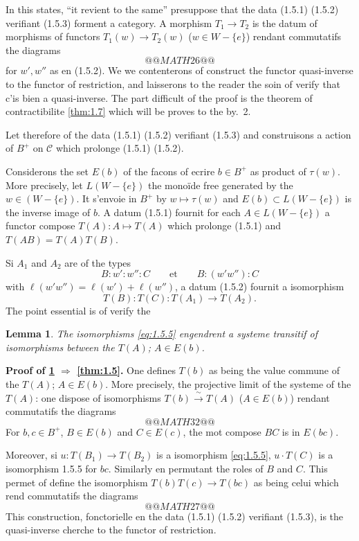 \documentclass[11pt,a4paper]{article}
\theoremstyle{plain}
\newtheorem{lemma}[theorem]{Lemma}
\theoremstyle{definition}
\newcommand{\cC}{\mathscr{C}}
\begin{document}
In this states, ``it revient to the same'' presuppose that the data (1.5.1) (1.5.2) verifiant (1.5.3) forment a category. A morphism $T_1 \to T_2$ is the datum of morphisms of functors $T_1(w) \to T_2(w)$ ($w \in W - \{e\}$) rendant commutatifs the diagrams
\[
@@MATH26@@
\]
for $w', w''$ as en (1.5.2). We we contenterons of construct the functor quasi-inverse to the functor of restriction, and laisserons to the reader the soin of verify that c'is bien a quasi-inverse. The part difficult of the proof is the theorem of contractibilite \ref{thm:1.7} which will be proves to the by.~2.

Let therefore of the data (1.5.1) (1.5.2) verifiant (1.5.3) and construisons a action of $B^+$ on $\cC$ which prolonge (1.5.1) (1.5.2).

Considerons the set $E(b)$ of the facons of ecrire $b \in B^+$ as product of $\tau(w)$. More precisely, let $L(W - \{e\})$ the mono\"ide free generated by the $w \in (W - \{e\})$. It s'envoie in $B^+$ by $w \mapsto \tau(w)$ and $E(b) \subset L(W - \{e\})$ is the inverse image of $b$. A datum (1.5.1) fournit for each $A \in L(W - \{e\})$ a functor compose $T(A) : A \mapsto T(A)$ which prolonge (1.5.1) and $T(AB) = T(A)T(B)$.

Si $A_1$ and $A_2$ are of the types
\begin{equation}\label{eq:1.5.4}
B : w' : w'' : C \qquad \text{et} \qquad B : (w'w'') : C
\end{equation}
with $\ell(w'w'') = \ell(w') + \ell(w'')$, a datum (1.5.2) fournit a isomorphism
\begin{equation}\label{eq:1.5.5}
T(B) : T(C) : T(A_1) \to T(A_2).
\tag{1.5.5}
\end{equation}
The point essential is of verify the

\begin{lemma}\label{lem:1.6}
The isomorphisms \eqref{eq:1.5.5} engendrent a systeme transitif of isomorphisms between the $T(A)$; $A \in E(b)$.
\end{lemma}

\noindent\textbf{Proof of \ref{lem:1.6} $\Rightarrow$ \ref{thm:1.5}.} One defines $T(b)$ as being the value commune of the $T(A)$; $A \in E(b)$. More precisely, the projective limit of the systeme of the $T(A)$: one dispose of isomorphisms $T(b) \xrightarrow{\;\sim\;} T(A)$ ($A \in E(b)$) rendant commutatifs the diagrams
\[
@@MATH32@@
\]
For $b, c \in B^+$, $B \in E(b)$ and $C \in E(c)$, the mot compose $BC$ is in $E(bc)$.

Moreover, si $u : T(B_1) \to T(B_2)$ is a isomorphism \eqref{eq:1.5.5}, $u \cdot T(C)$ is a isomorphism 1.5.5 for $bc$. Similarly en permutant the roles of $B$ and $C$. This permet of define the isomorphism $T(b)T(c) \to T(bc)$ as being celui which rend commutatifs the diagrams
\[
@@MATH27@@
\]
This construction, fonctorielle en the data (1.5.1) (1.5.2) verifiant (1.5.3), is the quasi-inverse cherche to the functor of restriction.
\end{document}
